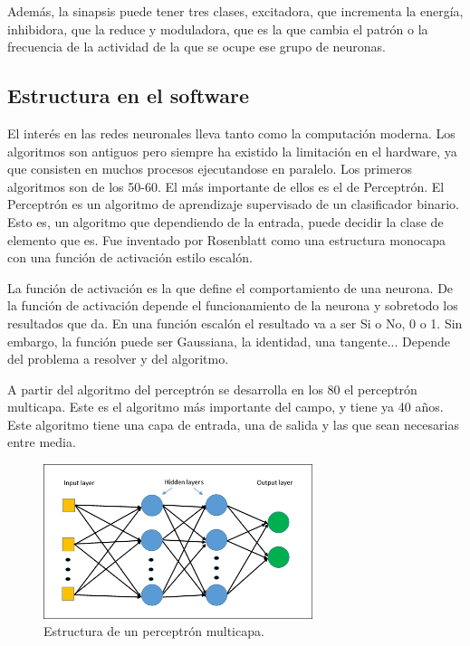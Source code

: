 \documentclass[12pt]{book}
\numberwithin{equation}{section}
\begin{document}
Además, la sinapsis puede tener tres clases, excitadora, que incrementa la energía, 	inhibidora, que la reduce y moduladora, que es la que cambia el patrón o la frecuencia de la actividad de la que se ocupe ese grupo de neuronas. 

\subsection{Estructura en el software}

El interés en las redes neuronales lleva tanto como la computación moderna. Los algoritmos son antiguos pero siempre ha existido la limitación en el hardware, ya que consisten en muchos procesos ejecutandose en paralelo. Los primeros algoritmos son de los 50-60. El más importante de ellos es el de Perceptrón. El Perceptrón es un algoritmo de aprendizaje supervisado de un clasificador binario. Esto es, un algoritmo que dependiendo de la entrada, puede decidir la clase de elemento que es. Fue inventado por Rosenblatt como una estructura monocapa con una función de activación estilo escalón.

La función de activación es la que define el comportamiento de una neurona. De la función de activación depende el funcionamiento de la neurona y sobretodo los resultados que da. En una función escalón el resultado va a ser Si o No, 0 o 1. Sin embargo, la función puede ser Gaussiana, la identidad, una tangente... Depende del problema a resolver y del algoritmo.

A partir del algoritmo del perceptrón se desarrolla en los 80 el perceptrón multicapa. Este es el algoritmo más importante del campo, y tiene ya 40 años. Este algoritmo tiene una capa de entrada, una de salida y las que sean necesarias entre media.

\begin{figure}[h]
    \centering
    \includegraphics[width=0.7\textwidth]{multicapa.jpg}
    \caption{Estructura de un perceptrón multicapa.}
    \label{fig:estructuraneurona}
\end{figure}
\end{document}
